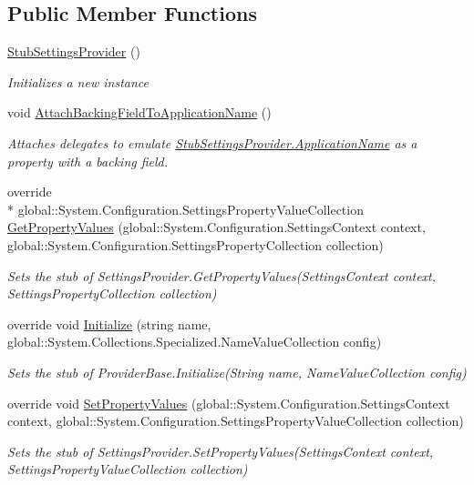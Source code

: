 \subsection*{Public Member Functions}
\begin{DoxyCompactItemize}
\item 
\hyperlink{class_system_1_1_configuration_1_1_fakes_1_1_stub_settings_provider_aeaff55ff23a4fe7db1f17e4f62aafe58}{Stub\-Settings\-Provider} ()
\begin{DoxyCompactList}\small\item\em Initializes a new instance\end{DoxyCompactList}\item 
void \hyperlink{class_system_1_1_configuration_1_1_fakes_1_1_stub_settings_provider_a064f9140b757c94dd8d1ac5fb80bdc70}{Attach\-Backing\-Field\-To\-Application\-Name} ()
\begin{DoxyCompactList}\small\item\em Attaches delegates to emulate \hyperlink{class_system_1_1_configuration_1_1_fakes_1_1_stub_settings_provider_a842009c70b4db6995e7a1bd80a41f8ef}{Stub\-Settings\-Provider.\-Application\-Name} as a property with a backing field.\end{DoxyCompactList}\item 
override \\*
global\-::\-System.\-Configuration.\-Settings\-Property\-Value\-Collection \hyperlink{class_system_1_1_configuration_1_1_fakes_1_1_stub_settings_provider_a274aa3e6c01c1dda009224b7610f25c7}{Get\-Property\-Values} (global\-::\-System.\-Configuration.\-Settings\-Context context, global\-::\-System.\-Configuration.\-Settings\-Property\-Collection collection)
\begin{DoxyCompactList}\small\item\em Sets the stub of Settings\-Provider.\-Get\-Property\-Values(\-Settings\-Context context, Settings\-Property\-Collection collection)\end{DoxyCompactList}\item 
override void \hyperlink{class_system_1_1_configuration_1_1_fakes_1_1_stub_settings_provider_af698bae0e2a3b6a1ef0bb5cc618fbc49}{Initialize} (string name, global\-::\-System.\-Collections.\-Specialized.\-Name\-Value\-Collection config)
\begin{DoxyCompactList}\small\item\em Sets the stub of Provider\-Base.\-Initialize(\-String name, Name\-Value\-Collection config)\end{DoxyCompactList}\item 
override void \hyperlink{class_system_1_1_configuration_1_1_fakes_1_1_stub_settings_provider_a6215cc54ff69f27b6ad84a192580d470}{Set\-Property\-Values} (global\-::\-System.\-Configuration.\-Settings\-Context context, global\-::\-System.\-Configuration.\-Settings\-Property\-Value\-Collection collection)
\begin{DoxyCompactList}\small\item\em Sets the stub of Settings\-Provider.\-Set\-Property\-Values(\-Settings\-Context context, Settings\-Property\-Value\-Collection collection)\end{DoxyCompactList}\end{DoxyCompactItemize}
